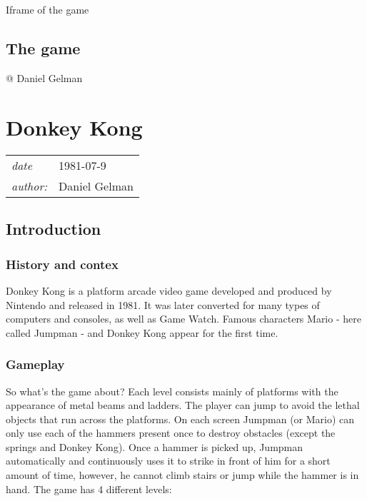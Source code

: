 \documentclass[a4paper,10pt]{book}
\newcommand{\pageHeader}[4]{
    \section{#1}
    \vspace{-0.3cm}
    \begin{table}[h!]
     \begin{tabular}{ll}
        \hline
        \textit{date} & #2 \\
        \textit{author: } & #3\\
        \hline
     \end{tabular}
    \end{table}
    \vspace{-0.3cm}
}
\begin{document}
 
 \subsection{}
 \subsubsection{}
   \textbf{}   \textit{}
  Iframe of the game  
 
 \subsection{The game }
 
 
 
 
 @ Daniel Gelman 
 
 
 \newpage\pageHeader{Donkey Kong}{1981-07-9}{Daniel Gelman}{Donkey Kong is an arcade game released by Nintendo. A debut for Mario and a debut for Donkey, this game is just synonymous with famous. Prove me wrong.}
 \subsection{Introduction }
 \subsubsection{History and contex }
   \textbf{}   \textit{}
 
                Donkey Kong is a platform arcade video game developed and produced by Nintendo and released in 1981. It was later converted for many types of computers and consoles, as well as Game  Watch. Famous characters Mario - here called Jumpman - and Donkey Kong
                appear for the first time.
             
 \subsubsection{Gameplay }
   \textbf{}   \textit{}
 
                So what's the game about?   Each level consists mainly of platforms with the appearance of metal beams and ladders. The player can jump to avoid the lethal objects that run across the platforms. On each screen Jumpman (or Mario) can
                only use each of the hammers present once to destroy obstacles (except the springs and Donkey Kong). Once a hammer is picked up, Jumpman automatically and continuously uses it to strike in front of him for a short amount of time, however,
                he cannot climb stairs or jump while the hammer is in hand. The game has 4 different levels:
                 
\end{document}
